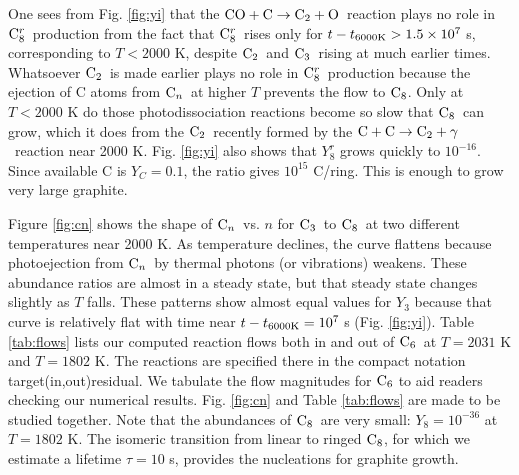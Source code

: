 \documentclass[manuscript]{aastex}
\newcommand{\ctwo}{{\rm C}_2}
\newcommand{\cthree}{{\rm C}_3}
\newcommand{\csix}{{\rm C}_6}
\newcommand{\ceight}{{\rm C}_8}
\newcommand{\ceightr}{{\rm C}_8^r}
\newcommand{\cenn}{{\rm C}_n}
\newcommand{\twoctoctwo}{${\rm C} + {\rm C} \to \ctwo + \gamma$}
\newcommand{\coctoctwo}{${\rm CO} + {\rm C} \to \ctwo + {\rm O}$}
\begin{document}
\begin{CJK*}{UTF8}{gbsn}
One sees from Fig. \ref{fig:yi} that the \coctoctwo\ reaction plays no
role in $\ceightr$\ production from the fact that $\ceightr$\ rises only for
$t - t_{6000 {\rm K}} > 1.5 \times 10^7$ s, corresponding to $T < 2000$ K,
despite $\ctwo$\ and $\cthree$\ rising at much earlier times.
Whatsoever $\ctwo$\ is made earlier plays no role in $\ceightr$\ production
because the ejection of C atoms from $\cenn$\ at higher $T$ prevents the
flow to $\ceight$.  Only at $T < 2000$ K do those photodissociation reactions
become so slow that $\ceight$\ can grow, which it does from the $\ctwo$\
recently
formed by the \twoctoctwo\ reaction near 2000 K.  Fig. \ref{fig:yi} also shows
that $Y_8^r$
grows quickly to $10^{-16}$.  Since available C is $Y_C = 0.1$,
the ratio gives $10^{15}$ C/ring.  This is enough to grow very large
graphite.

Figure \ref{fig:cn} shows the shape of $\cenn$\ vs. $n$ for $\cthree$\ to
$\ceight$\ at two different temperatures near 2000 K. As temperature declines,
the curve flattens because photoejection from $\cenn$\ by thermal photons
(or vibrations) weakens. These abundance ratios are almost in a steady state,
but that steady state changes slightly as $T$ falls. These patterns show
almost equal values for $Y_3$ because that curve is relatively flat
with time near $t-t_{6000 {\rm K}} = 10^7$ s (Fig. \ref{fig:yi}).
Table \ref{tab:flows} lists our computed reaction flows both in and out of
$\csix$\ at $T = 2031$ K and $T = 1802$ K.
The reactions are specified there in the
compact notation target(in,out)residual. 
We tabulate the flow magnitudes for $\csix$ to aid readers checking our
numerical results. Fig. \ref{fig:cn} and
Table \ref{tab:flows} are made to be studied together.
Note that the abundances of $\ceight$\ are very small:
$Y_8= 10^{-36}$ at $T = 1802$ K.
The isomeric transition from linear to
ringed $\ceight$, for which we estimate a lifetime $\tau = 10$ s,
provides the nucleations for graphite growth.


\end{CJK*}
\end{document}
